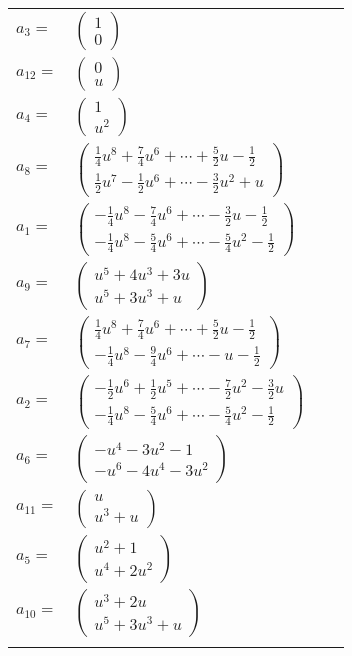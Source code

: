 \documentclass[1p]{elsarticle_modified}
\theoremstyle{definition}
\begin{document}
\begin{tabular}{m{7pt} m{180pt} m{7pt} m{180pt} }
\flushright $a_{3}=$&$\begin{pmatrix}1\\0\end{pmatrix}$ \\
\flushright $a_{12}=$&$\begin{pmatrix}0\\u\end{pmatrix}$ \\
\flushright $a_{4}=$&$\begin{pmatrix}1\\u^2\end{pmatrix}$ \\
\flushright $a_{8}=$&$\begin{pmatrix}\frac{1}{4} u^8+\frac{7}{4} u^6+\cdots+\frac{5}{2} u-\frac{1}{2}\\\frac{1}{2} u^7-\frac{1}{2} u^6+\cdots-\frac{3}{2} u^2+u\end{pmatrix}$ \\
\flushright $a_{1}=$&$\begin{pmatrix}-\frac{1}{4} u^8-\frac{7}{4} u^6+\cdots-\frac{3}{2} u-\frac{1}{2}\\-\frac{1}{4} u^8-\frac{5}{4} u^6+\cdots-\frac{5}{4} u^2-\frac{1}{2}\end{pmatrix}$ \\
\flushright $a_{9}=$&$\begin{pmatrix}u^5+4 u^3+3 u\\u^5+3 u^3+u\end{pmatrix}$ \\
\flushright $a_{7}=$&$\begin{pmatrix}\frac{1}{4} u^8+\frac{7}{4} u^6+\cdots+\frac{5}{2} u-\frac{1}{2}\\-\frac{1}{4} u^8-\frac{9}{4} u^6+\cdots- u-\frac{1}{2}\end{pmatrix}$ \\
\flushright $a_{2}=$&$\begin{pmatrix}-\frac{1}{2} u^6+\frac{1}{2} u^5+\cdots-\frac{7}{2} u^2-\frac{3}{2} u\\-\frac{1}{4} u^8-\frac{5}{4} u^6+\cdots-\frac{5}{4} u^2-\frac{1}{2}\end{pmatrix}$ \\
\flushright $a_{6}=$&$\begin{pmatrix}- u^4-3 u^2-1\\- u^6-4 u^4-3 u^2\end{pmatrix}$ \\
\flushright $a_{11}=$&$\begin{pmatrix}u\\u^3+u\end{pmatrix}$ \\
\flushright $a_{5}=$&$\begin{pmatrix}u^2+1\\u^4+2 u^2\end{pmatrix}$ \\
\flushright $a_{10}=$&$\begin{pmatrix}u^3+2 u\\u^5+3 u^3+u\end{pmatrix}$\\&\end{tabular}
\end{document}
